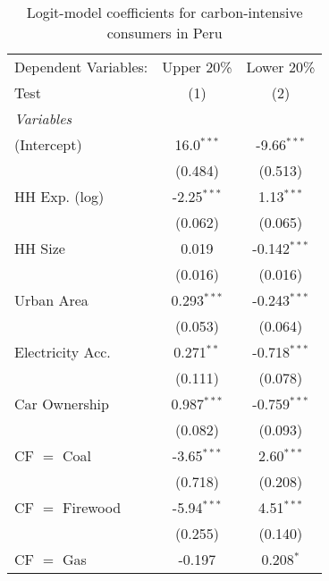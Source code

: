 
\begin{table}[htbp!]
   \centering
   \small
   \begin{adjustbox}{width = 1\textwidth, max height = 0.95\textheight, center}
      \begin{threeparttable}[b]
         \caption{\label{tab:Logit_1_PER} Logit-model coefficients for carbon-intensive consumers in Peru}
         \begin{tabular}{lcc}
            \tabularnewline \midrule \midrule
            Dependent Variables: & Upper 20\%    & Lower 20\%\\   
            Test                 & (1)           & (2)\\  
            \midrule
            \emph{Variables}\\
            (Intercept)          & 16.0$^{***}$  & -9.66$^{***}$\\   
                                 & (0.484)       & (0.513)\\   
            HH Exp. (log)        & -2.25$^{***}$ & 1.13$^{***}$\\   
                                 & (0.062)       & (0.065)\\   
            HH Size              & 0.019         & -0.142$^{***}$\\   
                                 & (0.016)       & (0.016)\\   
            Urban Area           & 0.293$^{***}$ & -0.243$^{***}$\\   
                                 & (0.053)       & (0.064)\\   
            Electricity Acc.     & 0.271$^{**}$  & -0.718$^{***}$\\   
                                 & (0.111)       & (0.078)\\   
            Car Ownership        & 0.987$^{***}$ & -0.759$^{***}$\\   
                                 & (0.082)       & (0.093)\\   
            CF $=$ Coal          & -3.65$^{***}$ & 2.60$^{***}$\\   
                                 & (0.718)       & (0.208)\\   
            CF $=$ Firewood      & -5.94$^{***}$ & 4.51$^{***}$\\   
                                 & (0.255)       & (0.140)\\   
            CF $=$ Gas           & -0.197        & 0.208$^{*}$\\   

\end{tabular}
\end{threeparttable}
\end{adjustbox}
\end{table}
